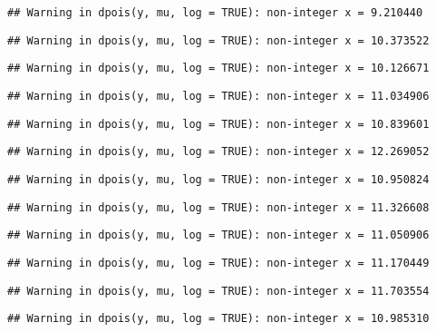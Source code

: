 \documentclass[
]{article}
\begin{document}
\begin{verbatim}
## Warning in dpois(y, mu, log = TRUE): non-integer x = 9.210440
\end{verbatim}

\begin{verbatim}
## Warning in dpois(y, mu, log = TRUE): non-integer x = 10.373522
\end{verbatim}

\begin{verbatim}
## Warning in dpois(y, mu, log = TRUE): non-integer x = 10.126671
\end{verbatim}

\begin{verbatim}
## Warning in dpois(y, mu, log = TRUE): non-integer x = 11.034906
\end{verbatim}

\begin{verbatim}
## Warning in dpois(y, mu, log = TRUE): non-integer x = 10.839601
\end{verbatim}

\begin{verbatim}
## Warning in dpois(y, mu, log = TRUE): non-integer x = 12.269052
\end{verbatim}

\begin{verbatim}
## Warning in dpois(y, mu, log = TRUE): non-integer x = 10.950824
\end{verbatim}

\begin{verbatim}
## Warning in dpois(y, mu, log = TRUE): non-integer x = 11.326608
\end{verbatim}

\begin{verbatim}
## Warning in dpois(y, mu, log = TRUE): non-integer x = 11.050906
\end{verbatim}

\begin{verbatim}
## Warning in dpois(y, mu, log = TRUE): non-integer x = 11.170449
\end{verbatim}

\begin{verbatim}
## Warning in dpois(y, mu, log = TRUE): non-integer x = 11.703554
\end{verbatim}

\begin{verbatim}
## Warning in dpois(y, mu, log = TRUE): non-integer x = 10.985310
\end{verbatim}
\end{document}
